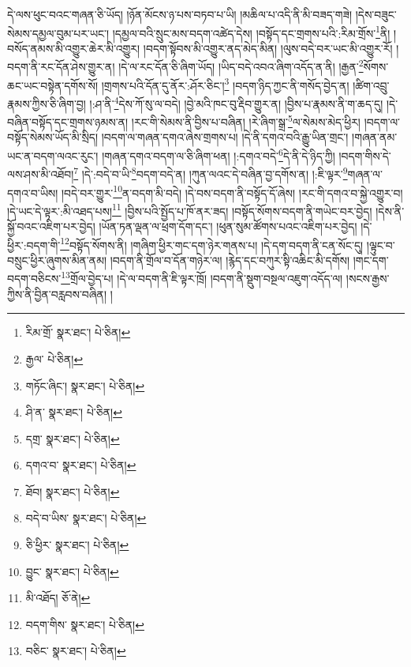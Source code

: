 དེ་ལས་ཕུང་བའང་གཞན་ཅི་ཡོད། །ཉོན་མོངས་ཉ་པས་བཏབ་པ་ཡི། །མཆིལ་པ་འདི་ནི་མི་བཟད་གཟེ། །དེས་བཟུང་སེམས་དམྱལ་བུམ་པར་ཡང་། །དམྱལ་བའི་སྲུང་མས་བདག་འཚེད་དེས། །བསྟོད་དང་གྲགས་པའི་:རིམ་གྲོས་\footnote{རིམ་གྲོ་  སྣར་ཐང་།  པེ་ཅིན། }ནི། །བསོད་ནམས་མི་འགྱུར་ཆེར་མི་འགྱུར། །བདག་སྟོབས་མི་འགྱུར་ནད་མེད་མིན། །ལུས་བདེ་བར་ཡང་མི་འགྱུར་རོ། །བདག་ནི་རང་དོན་ཤེས་གྱུར་ན། །དེ་ལ་རང་དོན་ཅི་ཞིག་ཡོད། །ཡིད་བདེ་འབའ་ཞིག་འདོད་ན་ནི། །རྒྱན་\footnote{རྒྱལ་  པེ་ཅིན། }སོགས་ཆང་ཡང་བསྟེན་དགོས་སོ། །གྲགས་པའི་དོན་དུ་ནོར་:ཤོར་ཅིང་།\footnote{གཏོང་ཞིང་།  སྣར་ཐང་།  པེ་ཅིན། } །བདག་ཉིད་ཀྱང་ནི་གསོད་བྱེད་ན། །ཚིག་འབྲུ་རྣམས་ཀྱིས་ཅི་ཞིག་བྱ། །:ཤ་ནི་\footnote{ཤི་ན་  སྣར་ཐང་།  པེ་ཅིན། }དེས་ཀོ་སུ་ལ་བདེ། །བྱེ་མའི་ཁང་བུ་རྡིབ་གྱུར་ན། །བྱིས་པ་རྣམས་ནི་ག་ཆད་དུ། །དེ་བཞིན་བསྟོད་དང་གྲགས་ཉམས་ན། །རང་གི་སེམས་ནི་བྱིས་པ་བཞིན། །རེ་ཞིག་སྒྲ་\footnote{དགྲ་  སྣར་ཐང་།  པེ་ཅིན། }ལ་སེམས་མེད་ཕྱིར། །བདག་ལ་བསྟོད་སེམས་ཡོད་མི་སྲིད། །བདག་ལ་གཞན་དགའ་ཞེས་གྲགས་པ། །དེ་ནི་དགའ་བའི་རྒྱུ་ཡིན་གྲང་། །གཞན་ནམ་ཡང་ན་བདག་ལའང་རུང་། །གཞན་དགའ་བདག་ལ་ཅི་ཞིག་ཕན། །:དགའ་བདེ་\footnote{དགའ་བ་  སྣར་ཐང་།  པེ་ཅིན། }དེ་ནི་དེ་ཉིད་ཀྱི། །བདག་གིས་དེ་ལས་ཤས་མི་འཐོབ།\footnote{ཐོབ།  སྣར་ཐང་།  པེ་ཅིན། } །དེ་:བདེ་བ་ཡི་\footnote{བདེ་བ་ཡིས་  སྣར་ཐང་།  པེ་ཅིན། }བདག་བདེ་ན། །ཀུན་ལའང་དེ་བཞིན་བྱ་དགོས་ན། །:ཇི་ལྟར་\footnote{ཅི་ཕྱིར་  སྣར་ཐང་།  པེ་ཅིན། }གཞན་ལ་དགའ་བ་ཡིས། །བདེ་བར་གྱུར་\footnote{བྱུང་  སྣར་ཐང་།  པེ་ཅིན། }ན་བདག་མི་བདེ། །དེ་བས་བདག་ནི་བསྟོད་དོ་ཞེས། །རང་གི་དགའ་བ་སྐྱེ་འགྱུར་བ། །དེ་ཡང་དེ་ལྟར་:མི་འཐད་པས།\footnote{མི་འཐོད།  ཅོ་ནེ། } །བྱིས་པའི་སྤྱོད་པ་ཁོ་ནར་ཟད། །བསྟོད་སོགས་བདག་ནི་གཡེང་བར་བྱེད། །དེས་ནི་སྐྱོ་བའང་འཇིག་པར་བྱེད། །ཡོན་ཏན་ལྡན་ལ་ཕྲག་དོག་དང་། །ཕུན་སུམ་ཚོགས་པའང་འཇིག་པར་བྱེད། །དེ་ཕྱིར་:བདག་གི་\footnote{བདག་གིས་  སྣར་ཐང་།  པེ་ཅིན། }བསྟོད་སོགས་ནི། །གཞིག་ཕྱིར་གང་དག་ཉེར་གནས་པ། །དེ་དག་བདག་ནི་ངན་སོང་དུ། །ལྟུང་བ་བསྲུང་ཕྱིར་ཞུགས་མིན་ནམ། །བདག་ནི་གྲོལ་བ་དོན་གཉེར་ལ། །རྙེད་དང་བཀུར་སྟི་འཆིང་མི་དགོས། །གང་དག་བདག་བཅིངས་\footnote{བཅིང་  སྣར་ཐང་།  པེ་ཅིན། }གྲོལ་བྱེད་པ། །དེ་ལ་བདག་ནི་ཇི་ལྟར་ཁྲོ། །བདག་ནི་སྡུག་བསྔལ་འཇུག་འདོད་ལ། །སངས་རྒྱས་ཀྱིས་ནི་བྱིན་བརླབས་བཞིན། །
